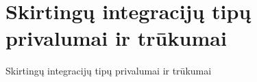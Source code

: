 \section{Skirtingų integracijų tipų privalumai ir trūkumai}
Skirtingų integracijų tipų privalumai ir trūkumai